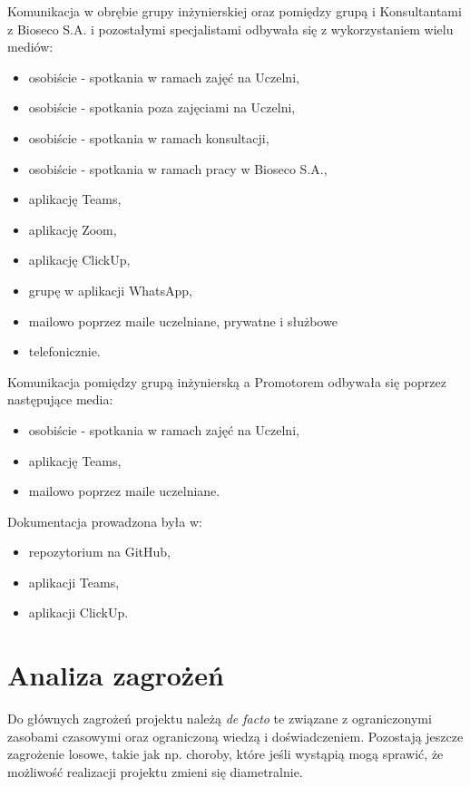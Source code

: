 \documentclass{sprz}
\begin{document}
Komunikacja w obrębie grupy inżynierskiej oraz pomiędzy grupą i Konsultantami z Bioseco S.A. i pozostałymi specjalistami odbywała się z wykorzystaniem wielu mediów:
\begin{itemize}
  \item{osobiście - spotkania w ramach zajęć na Uczelni,}
  \item{osobiście - spotkania poza zajęciami na Uczelni,}
  \item{osobiście - spotkania w ramach konsultacji,}
  \item{osobiście - spotkania w ramach pracy w Bioseco S.A.,}
  \item{aplikację Teams,}
  \item{aplikację Zoom,}
  \item{aplikację ClickUp,}
  \item{grupę w aplikacji WhatsApp,}
  \item{mailowo poprzez maile uczelniane, prywatne i służbowe}
  \item{telefonicznie.}
  \end{itemize}

  Komunikacja pomiędzy grupą inżynierską a Promotorem odbywała się poprzez następujące media:
\begin{itemize}
  \item{osobiście - spotkania w ramach zajęć na Uczelni,}
  \item{aplikację Teams,}
  \item{mailowo poprzez maile uczelniane.}
  \end{itemize}

Dokumentacja prowadzona była w:
\begin{itemize}
  \item{repozytorium na GitHub,}
  \item{aplikacji Teams,}
  \item{aplikacji ClickUp.}
  \end{itemize}

\section{Analiza zagrożeń}

Do głównych zagrożeń projektu należą \textit{de facto} te związane z ograniczonymi zasobami czasowymi oraz ograniczoną wiedzą i doświadczeniem. Pozostają jeszcze zagrożenie losowe, takie jak np. choroby, które jeśli wystąpią mogą sprawić, że możliwość realizacji projektu zmieni się diametralnie.
\end{document}
